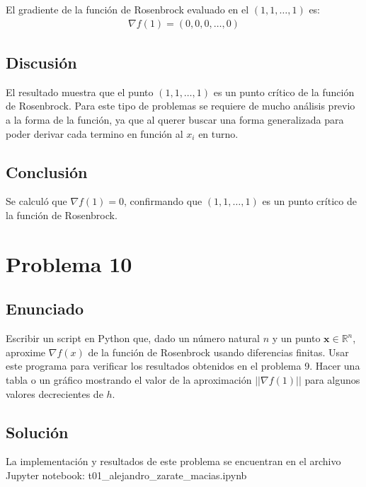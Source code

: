 \documentclass{article}
\begin{document}
El gradiente de la función de Rosenbrock evaluado en el $(1, 1, \ldots, 1)$ es:
\begin{align}
\nabla f(1) = (0, 0, 0, \ldots, 0)
\end{align}

\subsection{Discusión}
El resultado muestra que el punto $(1, 1, \ldots, 1)$ es un punto crítico de la función de Rosenbrock. Para este tipo de problemas se requiere de mucho análisis previo a la forma de la función, ya que al querer buscar una forma generalizada para poder derivar cada termino en función al $x_i$ en turno.

\subsection{Conclusión}
Se calculó que $\nabla f(1) = 0$, confirmando que $(1, 1, \ldots, 1)$ es un punto crítico de la función de Rosenbrock.


\section{Problema 10}

\subsection{Enunciado}
Escribir un script en Python que, dado un número natural $n$ y un punto $\mathbf{x} \in \mathbb{R}^n$, aproxime $\nabla f(x)$ de la función de Rosenbrock usando diferencias finitas. Usar este programa para verificar los resultados obtenidos en el problema 9. Hacer una tabla o un gráfico mostrando el valor de la aproximación $||\nabla f(1)||$ para algunos valores decrecientes de $h$.

\subsection{Solución}
La implementación y resultados de este problema se encuentran en el archivo Jupyter notebook: t01\_alejandro\_zarate\_macias.ipynb
\end{document}
